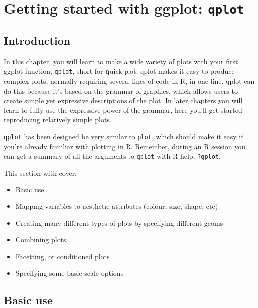 



\chapter{Getting started with ggplot: {\tt qplot}}

\section{Introduction} 

In this chapter, you will learn to make a wide variety of plots with your first ggplot function, {\tt qplot}, short for {\bf q}uick plot. qplot makes it easy to produce complex plots, normally requiring several lines of code in R, in one line. qplot can do this because it's based on the grammar of graphics, which allows users to create simple yet expressive descriptions of the plot.  In later chapters you will learn to fully use the expressive power of the grammar, here you'll get started reproducing relatively simple plots.

{\tt qplot} has been designed be very similar to {\tt plot}, which should make it easy if you're already familiar with plotting in R.  Remember, during an R session you can get a summary of all the arguments to {\tt qplot} with R help, {\tt ?qplot}.

This section with cover: 

\begin{itemize}
	\item Basic use
	\item Mapping variables to aesthetic attributes (colour, size, shape, etc)
	\item Creating many different types of plots by specifying different geoms
	\item Combining plots 
	\item Facetting, or conditioned plots
	\item Specifying some basic scale options
\end{itemize}

\section{Basic use}\label{sec:basic_use}

